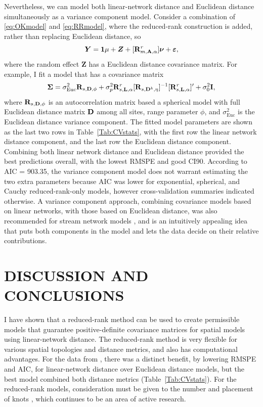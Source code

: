 \documentclass[11pt, titlepage]{article}\usepackage[]{graphicx}\usepackage[]{color}
\begin{document}
\begin{spacing}{1.9}
\begin{flushleft}
Nevertheless, we can model both linear-network distance and Euclidean distance simultaneously as a variance component model.  Consider a combination of \ref{eq:OKmodel} and \ref{eq:RRmodel}, where the reduced-rank construction is added, rather than replacing Euclidean distance, so
\[
\bm Y = \mathbf{1}\mu + \bm Z + [\mathbf{R}^r_{m,\mathbf{A},\alpha}]\mbox{\boldmath $\nu$} + \mbox{\boldmath $\varepsilon$},
\]
where the random effect $\bm Z$ has a Euclidean distance covariance matrix. For example, I fit a model that has a covariance matrix
\[
\mbox{\boldmath $\Sigma$} = \sigma^2_{\textrm{Euc}}\mathbf{R}_{s,\mathbf{D},\phi} + \sigma^2_p\mathbf{R}^r_{s,\mathbf{L},\alpha}[\mathbf{R}_{s,\mathbf{D}^k,\eta}]^{-1}[\mathbf{R}^r_{s,\mathbf{L},\alpha}]^{\prime} + \sigma^2_0\mathbf{I},
\]
where $\mathbf{R}_{s,\mathbf{D},\phi}$ is an autocorrelation matrix based a spherical model with full Euclidean distance matrix $\mathbf{D}$ among all sites, range parameter $\phi$, and $\sigma^2_{\textrm{Euc}}$ is the Euclidean distance variance component. The fitted model parameters are shown as the last two rows in Table~\ref{Tab:CVstats}, with the first row the linear network distance component, and the last row the Euclidean distance component.  Combining both linear network distance and Euclidean distance provided the best predictions overall, with the lowest RMSPE and good CI90. According to AIC = 903.35, the variance component model does not warrant estimating the two extra parameters because AIC was lower for exponential, spherical, and Cauchy reduced-rank-only models, however cross-validation summaries indicated otherwise.  A variance component approach, combining covariance models based on linear networks, with those based on Euclidean distance, was also recommended for stream network models \citep{Ver:Pete:Move:2010}, and is an intuitively appealing idea that puts both components in the model and lets the data decide on their relative contributions.

\section*{DISCUSSION AND CONCLUSIONS}

I have shown that a reduced-rank method can be used to create permissible models that guarantee positive-definite covariance matrices for spatial models using linear-network distance.  The reduced-rank method is very flexible for various spatial topologies and distance metrics, and also has computational advantages.  For the data from \citet{Ladl:Avga:Whea:Boyc:pred:2016}, there was a distinct benefit, by lowering RMSPE and AIC, for linear-network distance over Euclidean distance models, but the best model combined both distance metrics (Table~\ref{Tab:CVstats}).  For the reduced-rank models, consideration must be given to the number and placement of knots \citep{Rupp:Wand:Carr:semi:2003, Gelf:Bane:Finl:spat:2012}, which continues to be an area of active research.


\end{flushleft}
\end{spacing}
\end{document}
